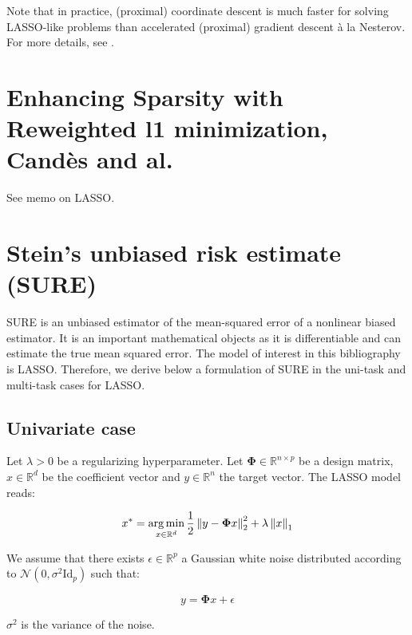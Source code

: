 \documentclass[a4paper,10pt]{article}
\theoremstyle{definition}
\begin{document}
\vskip 0.1in

Note that in practice, (proximal) coordinate descent is much faster for solving LASSO-like problems than accelerated (proximal) gradient descent à la Nesterov.
For more details, see \cite{Bertrand_Massias_Anderson}.

\section{Enhancing Sparsity with Reweighted l1 minimization, Candès and al.}

See memo on LASSO.

\section{Stein's unbiased risk estimate (SURE)}

SURE is an unbiased estimator of the mean-squared error of a nonlinear biased estimator.
It is an important mathematical objects as it is differentiable and can estimate the true
mean squared error. The model of interest in this bibliography is LASSO. Therefore, we derive below a formulation of SURE in
the uni-task and multi-task cases for LASSO.

\subsection*{Univariate case}

Let $\lambda > 0$ be a regularizing hyperparameter. Let $\mathbf{\Phi} \in \mathbb{R}^{n\times p}$ be a design matrix,
$x \in \mathbb{R}^d$ be the coefficient vector and $y \in \mathbb{R}^n$ the target vector.
The LASSO model reads:

\begin{equation*}
    x^* = \operatorname*{arg\,min}_{x \in \mathbb{R}^d} \frac{1}{2}\left \lVert y - \mathbf{\Phi}x \right \rVert_2^2 + \lambda \left \lVert x \right \rVert_1
\end{equation*}

We assume that there exists $\epsilon \in \mathbb{R}^p$ a Gaussian white noise distributed according to
$\mathcal{N}(0, \sigma^2 \text{Id}_p)$ such that:

\begin{equation*}
    y = \mathbf{\Phi}x + \epsilon
\end{equation*}

$\sigma^2$ is the variance of the noise.

\newpage


\end{document}
